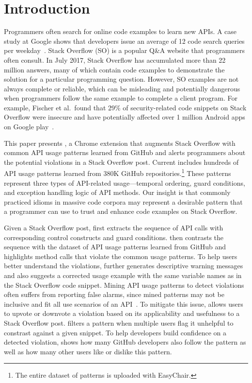 \section{Introduction}
\label{sec:intro}
Programmers often search for online code examples to learn new APIs. A case study at Google shows that developers issue an average of 12 code search queries per weekday~\cite{sadowski2015developers}. Stack Overflow (SO) is a popular Q\&A website that programmers often consult. In July 2017, Stack Overflow has accumulated more than 22 million answers, many of which contain code examples to demonstrate the solution for a particular programming question. However, SO examples are not always complete or reliable, which can be misleading and potentially dangerous when programmers follow the same example to complete a client program. For example, Fischer et al.~found that 29\% of security-related code snippets on Stack Overflow were insecure and have potentially affected over 1 million Android apps on Google play~\cite{fischer2017stack}. 

This paper presents {\tool}, a Chrome extension that augments Stack Overflow with common API usage patterns learned from GitHub and alerts programmers about the potential violations in a Stack Overflow post. Current {\tool} includes hundreds of API usage patterns learned from 380K GitHub repositories.\footnote{The entire dataset of patterns is uploaded with EasyChair.} These patterns represent three types of API-related usage---temporal ordering, guard conditions, and exception handling logic of API methods. Our insight is that commonly practiced idioms in massive code corpora may represent a desirable pattern that a programmer can use to trust and enhance code examples on Stack Overflow. 

Given a Stack Overflow post, {\tool} first extracts the sequence of API calls with corresponding control constructs and guard conditions. {\tool} then contrasts the sequence with the dataset of API usage patterns learned from GitHub and highlights method calls that violate the common usage patterns. To help users better understand the violations, {\tool} further generates descriptive warning messages and also suggests a corrected usage example with the same variable names as in the Stack Overflow code snippet. Mining API usage patterns to detect violations often suffers from reporting false alarms, since mined patterns may not be inclusive and fit all use scenarios of an API~\cite{liang2016antminer}. To mitigate this issue, {\tool} allows users to upvote or downvote a violation based on its applicability and usefulness to a Stack Overflow post. {\tool} filters a pattern when multiple users flag it unhelpful to constrast against a given snippet. To help developers build confidence on a detected violation, {\tool} shows how many GitHub developers also follow the pattern as well as how many other users like or dislike this pattern.

